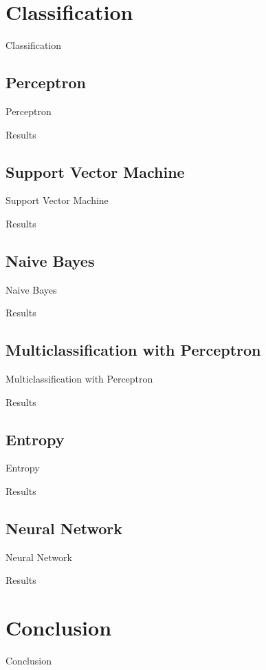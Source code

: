 \documentclass{beamer}
\begin{document}
\section{Classification}
\begin{frame}{Classification}
\end{frame}

\subsection{Perceptron}
\begin{frame}{Perceptron}
\end{frame}
\begin{frame}{Results}
\end{frame}

\subsection{Support Vector Machine}
\begin{frame}{Support Vector Machine}
\end{frame}
\begin{frame}{Results}
\end{frame}

\subsection{Naive Bayes}
\begin{frame}{Naive Bayes}
\end{frame}
\begin{frame}{Results}
\end{frame}

\subsection{Multiclassification with Perceptron}
\begin{frame}{Multiclassification with Perceptron}
\end{frame}
\begin{frame}{Results}
\end{frame}

\subsection{Entropy}
\begin{frame}{Entropy}
\end{frame}
\begin{frame}{Results}
\end{frame}

\subsection{Neural Network}
\begin{frame}{Neural Network}
\end{frame}
\begin{frame}{Results}
\end{frame}



\section{Conclusion}

\begin{frame}{Conclusion}
\end{frame}
\end{document}
